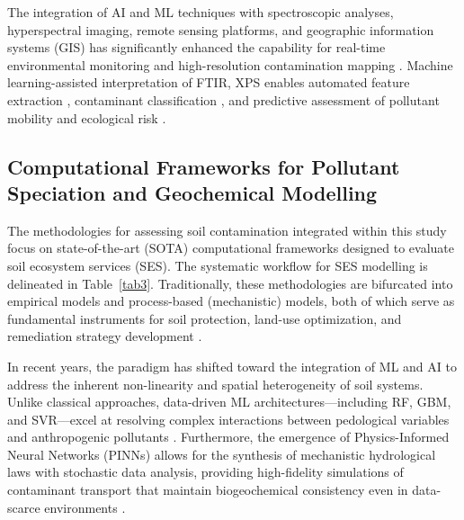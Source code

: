 \documentclass[environments,article,submit,pdftex,moreauthors]{Definitions/mdpi}
\begin{document}
The integration of AI and ML techniques with spectroscopic analyses,
hyperspectral imaging, remote sensing platforms, and geographic information
systems (GIS) has significantly enhanced the capability for real-time
environmental monitoring and high-resolution contamination mapping
\cite{Hu2024}. Machine learning-assisted
interpretation of FTIR, XPS enables automated feature extraction \cite{Canero,Yacomelo}, contaminant classification \cite{Agyeman2022,Hu2024}, and predictive assessment of
pollutant mobility and ecological risk
\cite{Shaheen2018,Anifowose2024,Foronda2023}.

\subsection{Computational Frameworks for Pollutant Speciation and
    Geochemical Modelling}\label{sec3.3}

The methodologies for assessing soil contamination integrated within this
study focus on state-of-the-art (SOTA) computational frameworks designed to
evaluate soil ecosystem services (SES). The systematic workflow for SES
modelling is delineated in Table~\ref{tab3}. Traditionally, these
methodologies are bifurcated into empirical models and process-based
(mechanistic) models, both of which serve as fundamental instruments for soil
protection, land-use optimization, and remediation strategy development
\cite{TeranGomez2025,ElSorogy2025,Sandu2025}.

In recent years, the paradigm has shifted toward the integration of ML and AI
to address the inherent non-linearity and spatial heterogeneity of soil
systems. Unlike classical approaches, data-driven ML architectures---including
RF, GBM, and SVR---excel at resolving complex interactions between pedological
variables and anthropogenic pollutants \cite{Li2025a,Racic2025}. Furthermore,
the emergence of Physics-Informed Neural Networks (PINNs) allows for the
synthesis of mechanistic hydrological laws with stochastic data analysis,
providing high-fidelity simulations of contaminant transport that maintain
biogeochemical consistency even in data-scarce environments \cite{Haruzi}.
\end{document}
